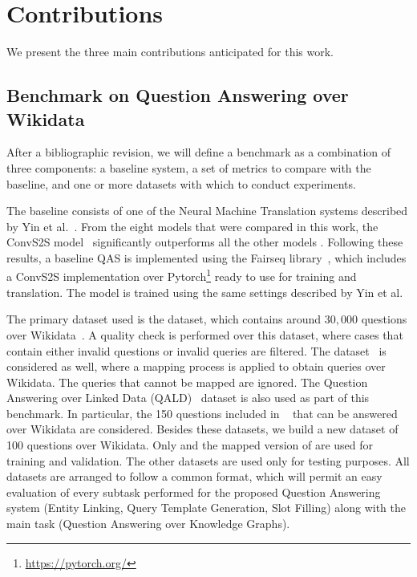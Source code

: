\section{Contributions}
\label{cap1:intro/contributions}
We present the three main contributions anticipated for this work.
\subsection*{Benchmark on Question Answering over Wikidata}
After a bibliographic revision, we will define a benchmark as a combination of three 
components: a baseline system, a set of metrics to compare with the baseline, and one or 
more datasets with which to conduct experiments.

The baseline consists of one of the Neural Machine Translation systems described by 
Yin et al.~\cite{nmt:nl-to-sparql-Yin19}. From the eight models that were compared in this work, 
the ConvS2S model~\cite{nmt:convS2S-GehringAGYD17} 
significantly outperforms all the other models . Following these results, a baseline QAS is 
implemented using the Fairseq library~\cite{nmt:fairseq-OttEBFGNGA19}, which includes a ConvS2S implementation over 
Pytorch\footnote{\url{https://pytorch.org/}} ready to use for training and translation. The model is trained using the same 
settings described by Yin et al.

The primary dataset used is the \LCQuADtwo{} dataset, which contains around $30,000$ 
questions over Wikidata~\cite{dataset:lcquad2-DubeyBA019}. A quality check is performed over this dataset, where cases 
that contain either invalid questions or invalid \SPARQL{} queries are filtered. The \DBNQA{} 
dataset~\cite{dataset:dbnqa-hartmann-marx-soru-2018} is considered as well, where a mapping process is applied to obtain queries over 
Wikidata. The queries that cannot be mapped are ignored. The Question Answering over 
Linked Data (QALD)~\cite{qa:qald-Lopezetal2013} dataset is also used as part of this benchmark. In particular, the 
150 questions included in \QALDseven{}~\cite{dataset:qald7-UsbeckNHKRN17} that can be answered over Wikidata are considered. 
Besides these datasets, we build a new dataset of 100 questions over Wikidata. Only \LCQuADtwo{} 
and the mapped version of \DBNQA{} are used for training and validation. The other 
datasets are used only for testing purposes. All datasets are arranged to follow a common 
format, which will permit an easy evaluation of every subtask performed for the proposed 
Question Answering system (Entity Linking, Query Template Generation, Slot Filling) along 
with the main task (Question Answering over Knowledge Graphs).

